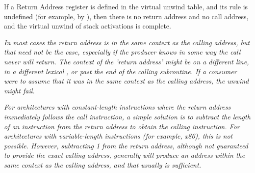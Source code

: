If a Return Address register is defined in the virtual
unwind table, and its rule is undefined (for example, by
\DWCFAundefined), then there is no return address and no
call address, and the virtual unwind of stack activations
is complete.

\textit{In most cases the return address is in the same context as the
calling address, but that need not be the case, especially if
the producer knows in some way the call never will return. The
context of the 'return address' might be on a different line,
in a different lexical , 
or past the end of the calling
subroutine. If a consumer were to assume that it was in the
same context as the calling address, the unwind might fail.}

\textit{For architectures with constant-length instructions where
the return address immediately follows the call instruction,
a simple solution is to subtract the length of an instruction
from the return address to obtain the calling instruction. For
architectures with variable-length instructions (for example, x86),
this is not possible. However, subtracting 1 from the return
address, although not guaranteed to provide the exact calling
address, generally will produce an address within the same
context as the calling address, and that usually is sufficient.}



